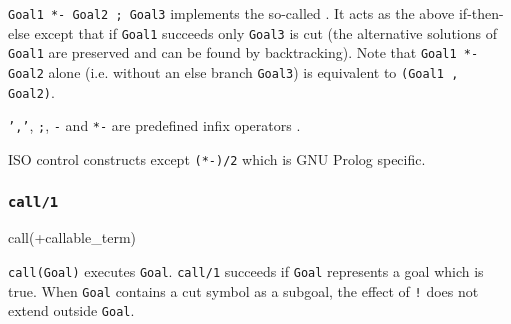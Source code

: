 \texttt{Goal1 *-{\gt} Goal2 ; Goal3} implements the so-called
. It acts as the above if-then-else except that if
\texttt{Goal1} succeeds only \texttt{Goal3} is cut (the alternative solutions
of \texttt{Goal1} are preserved and can be found by backtracking). Note that
\texttt{Goal1 *-{\gt} Goal2} alone (i.e. without an else branch
\texttt{Goal3}) is equivalent to \texttt{(Goal1 , Goal2)}.


\texttt{','}, \texttt{;}, \texttt{-{\gt}} and \texttt{*-{\gt}} are predefined
infix operators .

\begin{PlErrors}





\end{PlErrors}

\Portability

ISO control constructs except \texttt{(*-{\gt})/2} which is GNU Prolog specific.

\subsubsection{\texttt{call/1}}
\label{call/1}

\begin{TemplatesOneCol}
call(+callable\_term)

\end{TemplatesOneCol}

\Description

\texttt{call(Goal)} executes \texttt{Goal}. \texttt{call/1} succeeds if
\texttt{Goal} represents a goal which is true. When \texttt{Goal} contains a
cut symbol \IdxCC["!/0]{!}  as a subgoal, the effect of
\texttt{!} does not extend outside \texttt{Goal}.

\begin{PlErrors}




\end{PlErrors}

